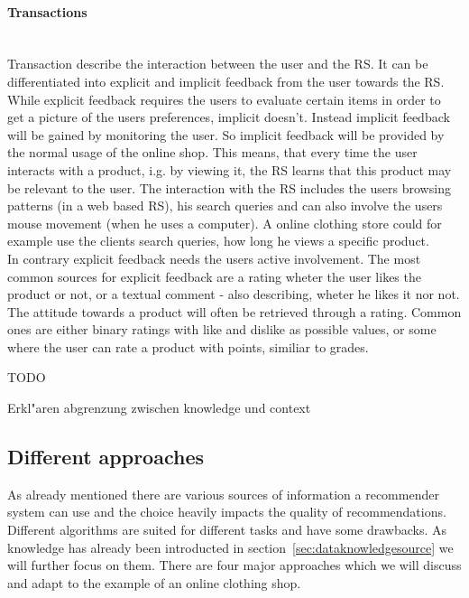 \paragraph{Transactions}~\\
\label{sec:feedback}
Transaction describe the interaction between the user and the RS.\citep[p.~9]{ricci:2011}
It can be differentiated into explicit and implicit feedback from the user towards the RS.
While explicit feedback requires the users to evaluate certain items in order to get a picture of the users preferences, implicit doesn't.
Instead implicit feedback will be gained by monitoring the user.\citep[p.~76-77]{lops:2011}
So implicit feedback will be provided by the normal usage of the online shop.
This means, that every time the user interacts with a product, i.g. by viewing it, the RS learns that this product may be relevant to the user.\citep{taghipour:2007}
The interaction with the RS includes the users browsing patterns (in a web based RS), his search queries and can also involve the users mouse movement (when he uses a computer).\citep[p.~146]{koren:2011}
A online clothing store could for example use the clients search queries, how long he views a specific product.\\
In contrary explicit feedback needs the users active involvement.
The most common sources for explicit feedback are a rating wheter the user likes the product or not, or a textual comment - also describing, wheter he likes it nor not.
The attitude towards a product will often be retrieved through a rating.
Common ones are either binary ratings with like and dislike as possible values, or some where the user can rate a product with points, similiar to grades.\citep[p.~77]{lops:2011}


TODO

Erkl"aren abgrenzung zwischen knowledge und context


\subsection{Different approaches}
\label{sec:recommenderapproaches}

As already mentioned there are various sources of information a recommender system can use and the choice heavily impacts the quality of recommendations.
Different algorithms are suited for different tasks and have some drawbacks.\citep[p.~377-378]{burke:2007}
As knowledge has already been introducted in section~\ref{sec:dataknowledgesource} we will further focus on them.
There are four major approaches which we will discuss and adapt to the example of an online clothing shop.

